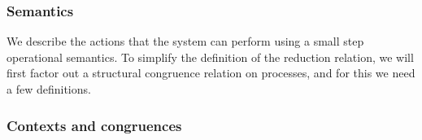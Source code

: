 


\subsubsection{Semantics}
We describe the actions that the system can perform using a small step operational semantics.
To simplify the definition of the reduction relation, we will first factor out a structural congruence relation on processes, and for this we need a few definitions.

\subsubsection{Contexts and congruences}


